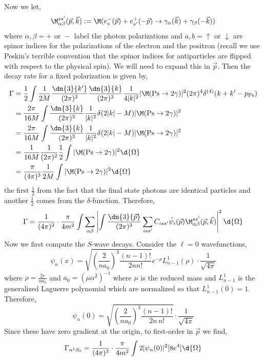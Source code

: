 \documentclass[12pt]{article}
\begin{document}
Now we let,
\[ \M^{ss'}_{\alpha \beta}(\vec{p}, \vec{k}) := \M(e^-_{s} (\vec{p}) + e^{+}_{s'}(-\vec{p}) \to \gamma_{\alpha}(\vec{k}) + \gamma_{\beta}(-\vec{k})) \]
where $\alpha, \beta = + \text{ or } -$ label the photon polarizations and $a,b = \uparrow \text{ or } \downarrow$ are spinor indices for the polarizations of the electron and the positron (recall we use Peskin's terrible convention that the spinor indices for antiparticles are flipped with respect to the physical spin).
We will need to expand this in $\vec{p}$. 
Then the decay rate for a fixed polarization is given by,
\begin{align*}
\Gamma &= \frac{1}{2} \int \frac{1}{2M} \frac{\dn{3}{k'}}{(2 \pi)^3} \frac{\dn{3}{k}}{(2 \pi)^3} \frac{1}{4 |k|^2} |\M(\text{Ps} \to 2 \gamma)|^2 (2 \pi)^4 \delta^{(4)}(k + k' - p_{\text{Ps}}) 
\\
& = \frac{2 \pi}{16 M} \int \frac{\dn{3}{k}}{(2 \pi)^3} \frac{1}{|k|^2} \delta(2 |k| - M) |\M(\text{Ps} \to 2 \gamma)|^2
\\
& = \frac{2 \pi}{16 M} \int \frac{\dn{3}{k}}{(2 \pi)^3} \frac{1}{|k|^2} \delta(2 |k| - M) |\M(\text{Ps} \to 2 \gamma)|^2
\\
& = \frac{1}{16 M} \frac{1}{(2 \pi)^2}  \frac{1}{2} \int |\M(\text{Ps} \to 2 \gamma)|^2 \d{\Omega}
\\
& = \frac{\pi}{(4 \pi)^3} \frac{1}{2 M} \int |\M(\text{Ps} \to 2 \gamma)|^2 \d{\Omega}
\end{align*}
the first $\frac{1}{2}$ from the fact that the final state photons are identical particles and another $\frac{1}{2}$ comes from the $\delta$-function. Therefore,
\[ \Gamma = \frac{1}{(4 \pi)^3} \cdot \frac{\pi}{4 m^2} \int \sum_{\alpha \beta} \left| \int \frac{\dn{3}{\vec{p}}}{(2 \pi)^3} \sum_{iss'} C_{i s s'} \tilde{\psi}_i(\vec{p}) \M^{ss'}_{\alpha \beta}(\vec{p}, \vec{k}) \right|^2 \d{\Omega} \]
Now we first compute the $S$-wave decays. Consider the $\ell = 0$ wavefunctions,
\[ \psi_n(x) = \sqrt{ \left( \frac{2}{n a_0} \right)^3 \frac{(n-1)!}{2n n!}} e^{-\rho} L^1_{n-1}(\rho) \cdot \frac{1}{\sqrt{4 \pi}} \]
where $\rho = \frac{2 r}{n a_0}$ and $a_0 = (\mu \alpha^2)^{-1}$ where $\mu$ is the reduced mass and $L^1_{n-1}$ is the generalized Laguerre polynomial which are normalized so that $L^1_{n-1}(0) = 1$. Therefore,
\[ \psi_n(0) = \sqrt{ \left( \frac{2}{n a_0} \right)^3 \frac{(n-1)!}{2n \, n!}} \cdot \frac{1}{\sqrt{4 \pi}} \]
Since these have zero gradient at the origin, to first-order in $\vec{p}$ we find,
\[ \Gamma_{{n}^1 S_0} = \frac{1}{(4 \pi)^3} \cdot \frac{\pi}{4 m^2} \int 2 |\psi_n(0)|^2 [8 e^4] \d{\Omega} \]
\end{document}
